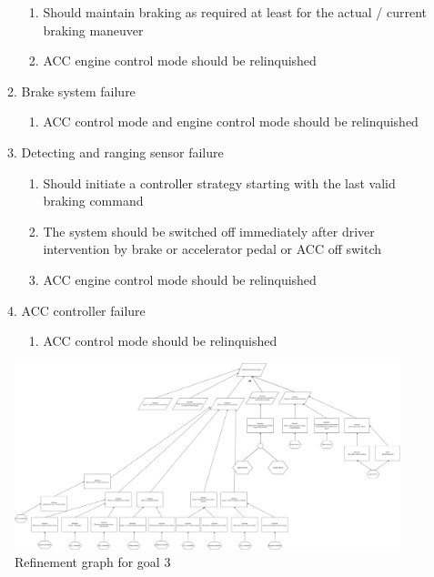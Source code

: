 \begin{enumerate}
\begin{enumerate}[label*=\arabic*]
\begin{enumerate}[label*=\arabic*]
           \item{Should maintain braking as required at least for the actual / current braking maneuver}
           \item{ACC engine control mode should be relinquished}
       \end{enumerate}
       \item{Brake system failure}
       \begin{enumerate}[label*=\arabic*]
           \item{ACC control mode and engine control mode should be relinquished}
       \end{enumerate}
       \item{Detecting and ranging sensor failure}
       \begin{enumerate}[label*=\arabic*]
           \item{Should initiate a controller strategy starting with the last valid braking command}
           \item{The system should be switched off immediately after driver intervention by brake or accelerator pedal or ACC off switch}
           \item{ACC engine control mode should be relinquished}
       \end{enumerate}
       \item{ACC controller failure}
       \begin{enumerate}[label*=\arabic*]
           \item{ACC control mode should be relinquished}
       \end{enumerate}
    \end{enumerate}
\end{enumerate}
\newpage

\begin{figure}[H]
    \hspace*{-4cm}
    \centering
    \includegraphics[scale=0.180]{images/RefinementGraph}
    \caption{Refinement graph for goal 3}
    \label{fig:graph_3}
\end{figure}




